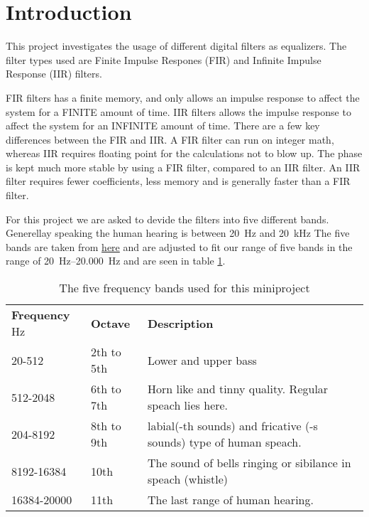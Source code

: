 
\section{Introduction}
This project investigates the usage of different digital filters as equalizers. The filter types used are Finite Impulse Respones (FIR) and Infinite Impulse Response (IIR) filters.

FIR filters has a finite memory, and only allows an impulse response to affect the system for a FINITE amount of time.
IIR filters allows the impulse response to affect the system for an INFINITE amount of time.
There are a few key differences between the FIR and IIR.
A FIR filter can run on integer math, whereas IIR requires floating point for the calculations not to blow up. The phase is kept much more stable by using a FIR filter, compared to an IIR filter.
An IIR filter requires fewer coefficients, less memory and is generally faster than a FIR filter.

For this project we are asked to devide the filters into five different bands. Generellay speaking the human hearing is between \SI{20}{\hertz} and \SI{20}{\kilo\hertz} The five bands are taken from \href{https://en.wikipedia.org/wiki/Audio_frequency}{here} and are adjusted to fit our range of five bands in the range of \SIrange{20}{20.000}{\hertz} and are seen in table \ref{tab:FiveBand}.

\begin{table}[h]
	\caption{The five frequency bands used for this miniproject}
	\label{tab:FiveBand}
	\begin{tabularx}{\textwidth}{X X X}
		\textbf{Frequency} \si{\hertz} & \textbf{Octave} & \textbf{Description} \\
		20-512 & 2th to 5th & Lower and upper bass \\
		512-2048 & 6th to 7th & Horn like and tinny quality. Regular speach lies here. \\
		204-8192 & 8th to 9th & labial(-th sounds) and fricative (-s sounds) type of human speach.\\
		8192-16384 & 10th & The sound of bells ringing or sibilance in speach (whistle)\\
		16384-20000 & 11th & The last range of human hearing. \\
	\end{tabularx}	
\end{table}




